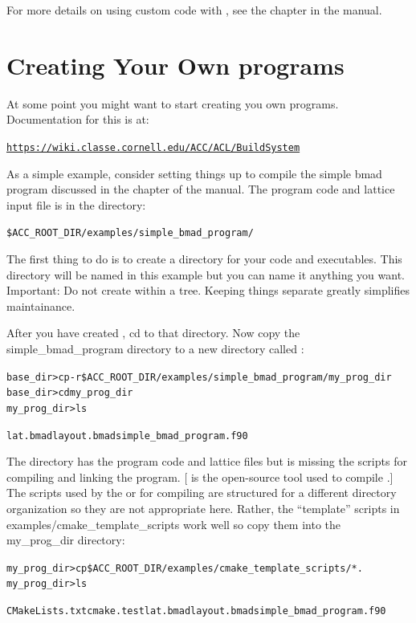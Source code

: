 \documentclass{hitec}
\begin{document}
For more details on using custom code with \tao, see the  chapter
in the \tao manual.

\section{Creating Your Own programs}

At some point you might want to start creating you own programs. Documentation for this is
at:
\begin{alltt}
  \url{https://wiki.classe.cornell.edu/ACC/ACL/BuildSystem}
\end{alltt}

As a simple example, consider setting things up to compile the simple bmad program
discussed in the  chapter of the \bmad manual.
The program code and lattice input file is in the directory:
\begin{alltt}
  \$ACC_ROOT_DIR/examples/simple_bmad_program/
\end{alltt}

The first thing to do is to create a  directory for your code and executables. This
directory will be named  in this example but you can name it anything you
want. Important: Do not create  within a  tree. Keeping things
separate greatly simplifies maintainance.

After you have created , cd to that directory. Now copy the
simple_bmad_program directory to a new directory called :
\begin{alltt}
  base_dir> cp -r \$ACC_ROOT_DIR/examples/simple_bmad_program/ my_prog_dir
  base_dir> cd my_prog_dir
  my_prog_dir> ls

  lat.bmad   layout.bmad   simple_bmad_program.f90
\end{alltt}

The  directory has the program code and lattice files but is
missing the  scripts for compiling and linking the program.  [ is the
open-source tool used to compile \bmad.] The scripts used by the  or
 for compiling are structured for a different directory organization so they
are not appropriate here. Rather, the ``template'' scripts in
examples/cmake_template_scripts work well so copy them into the my_prog_dir
directory:
\begin{alltt}
  my_prog_dir> cp \$ACC_ROOT_DIR/examples/cmake_template_scripts/* .
  my_prog_dir> ls

  CMakeLists.txt  cmake.test  lat.bmad  layout.bmad simple_bmad_program.f90
\end{alltt}
\end{document}
